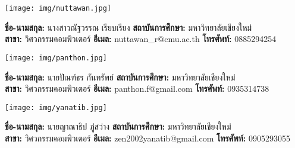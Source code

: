 \documentclass[final]{cpecmu}
\begin{document}
  \begin{biosketch}
    \begin{center}
      \texttt{[image: img/nuttawan.jpg]}
    \end{center}
    \textbf{ชื่อ-นามสกุล:} นางสาวณัฐวรรณ เรียบเรียง \quad
    \textbf{สถาบันการศึกษา:} มหาวิทยาลัยเชียงใหม่ \\
    \textbf{สาขา:} วิศวกรรมคอมพิวเตอร์ \quad
    \textbf{อีเมล:} nuttawan\_r@cmu.ac.th \quad
    \textbf{โทรศัพท์:} 0885294254 \\

    \begin{center}
      \texttt{[image: img/panthon.jpg]}
    \end{center}
    \textbf{ชื่อ-นามสกุล:} นายปัณฑ์ธร กันทรัพย์ \quad
    \textbf{สถาบันการศึกษา:} มหาวิทยาลัยเชียงใหม่ \\
    \textbf{สาขา:} วิศวกรรมคอมพิวเตอร์ \quad
    \textbf{อีเมล:} panthon.f@gmail.com \quad
    \textbf{โทรศัพท์:} 0935314738 \\

    \begin{center}
      \texttt{[image: img/yanatib.jpg]}
    \end{center}
    \textbf{ชื่อ-นามสกุล:} นายญาณาธิป ภู่สว่าง \quad
    \textbf{สถาบันการศึกษา:} มหาวิทยาลัยเชียงใหม่ \\
    \textbf{สาขา:} วิศวกรรมคอมพิวเตอร์ \quad
    \textbf{อีเมล:} zen2002yanatib@gmail.com \quad
    \textbf{โทรศัพท์:} 0905293055 \\
  \end{biosketch}
\fi %
\end{document}
